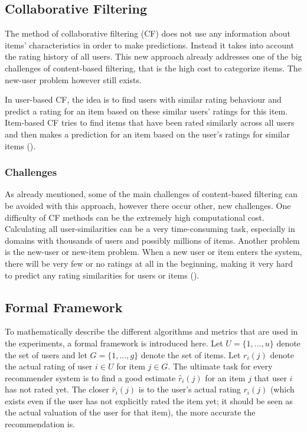 \subsection{Collaborative Filtering}
\label{sst:collaborativefiltering} The method of collaborative filtering (CF) does not use any information about items' characteristics in order to make predictions. Instead it takes into account the rating history of all users. This new approach already addresses one of the big challenges of content-based filtering, that is the high cost to categorize items. The new-user problem however still exists.

In user-based CF, the idea is to find users with similar rating behaviour and predict a rating for an item based on these similar users' ratings for this item. Item-based CF tries to find items that have been rated similarly across all users and then makes a prediction for an item based on the user's ratings for similar items (\cite{Parkes_2013}).

\subsubsection{Challenges}
\label{ssst:challengescf} As already mentioned, some of the main challenges of content-based filtering can be avoided with this approach, however there occur other, new challenges. One difficulty of CF methods can be the extremely high computational cost. Calculating all user-similarities can be a very time-consuming task, especially in domains with thousands of users and possibly millions of items. Another problem is the new-user or new-item problem. When a new user or item enters the system, there will be very few or no ratings at all in the beginning, making it very hard to predict any rating similarities for users or items (\cite{Parkes_2013}).

\subsection{Formal Framework}
\label{sst:formalframework} To mathematically describe the different algorithms and metrics that are used in the experiments, a formal framework is introduced here. Let $U = \{1,...,u\}$ denote the set of users and let $G = \{1,...,g\}$ denote the set of items. Let $r_i(j)$ denote the actual rating of user $i \in U$ for item $j \in G$. The ultimate task for every recommender system is to find a good estimate $\hat{r}_i(j)$ for an item $j$ that user $i$ has not rated yet. The closer $\hat{r}_i(j)$ is to the user's actual rating $r_i(j)$ (which exists even if the user has not explicitly rated the item yet; it should be seen as the actual valuation of the user for that item), the more accurate the recommendation is.

